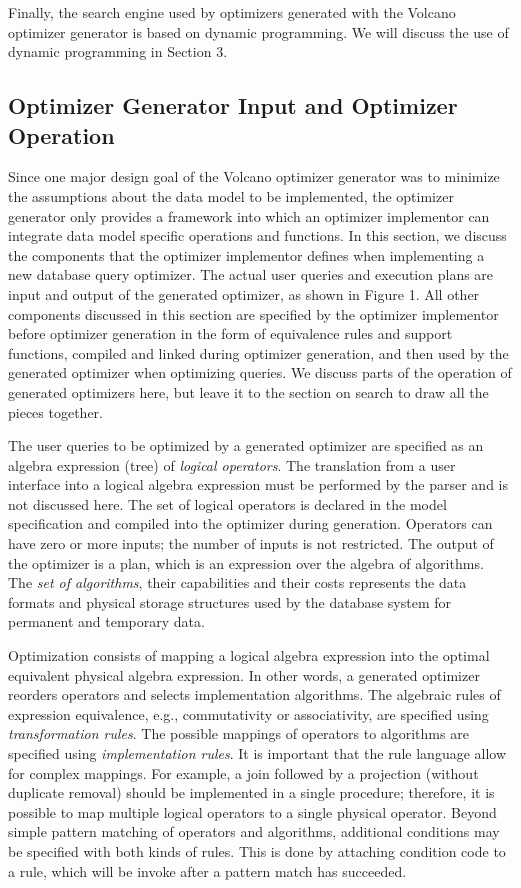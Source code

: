 \documentclass[a4paper,12pt,notitlepage,twoside,openright]{article}
\begin{document}
Finally, the search engine used by optimizers generated with the Volcano
optimizer generator is based on dynamic programming. We will discuss the
use of dynamic programming in Section 3.


\hypertarget{optimizer-generator-input-and-optimizer-operation}{%
\subsection{Optimizer Generator Input and Optimizer
Operation}\label{optimizer-generator-input-and-optimizer-operation}}

Since one major design goal of the Volcano optimizer generator was to
minimize the assumptions about the data model to be implemented, the
optimizer generator only provides a framework into which an optimizer
implementor can integrate data model specific operations and functions.
In this section, we discuss the components that the optimizer
implementor defines when implementing a new database query optimizer.
The actual user queries and execution plans are input and output of the
generated optimizer, as shown in Figure 1. All other components
discussed in this section are specified by the optimizer implementor
before optimizer generation in the form of equivalence rules and support
functions, compiled and linked during optimizer generation, and then
used by the generated optimizer when optimizing queries. We discuss
parts of the operation of generated optimizers here, but leave it to the
section on search to draw all the pieces together.

The user queries to be optimized by a generated optimizer are specified
as an algebra expression (tree) of \emph{logical operators}. The translation
from a user interface into a logical algebra expression must be
performed by the parser and is not discussed here. The set of logical
operators is declared in the model specification and compiled into the
optimizer during generation. Operators can have zero or more inputs; the
number of inputs is not restricted. The output of the optimizer is a
plan, which is an expression over the algebra of algorithms. The \emph{set of
algorithms}, their capabilities and their costs represents the data
formats and physical storage structures used by the database system for
permanent and temporary data.

Optimization consists of mapping a
logical algebra expression into the optimal equivalent physical algebra
expression. In other words, a generated optimizer reorders operators and
selects implementation algorithms. The algebraic rules of expression
equivalence, e.g., commutativity or associativity, are specified using
\emph{transformation rules}. The possible mappings of operators to algorithms
are specified using \emph{implementation rules}. It is important that the rule
language allow for complex mappings. For example, a join followed by a
projection (without duplicate removal) should be implemented in a single
procedure; therefore, it is possible to map multiple logical operators
to a single physical operator. Beyond simple pattern matching of
operators and algorithms, additional conditions may be specified with
both kinds of rules. This is done by attaching condition code to a rule,
which will be invoke after a pattern match has succeeded.
\end{document}
